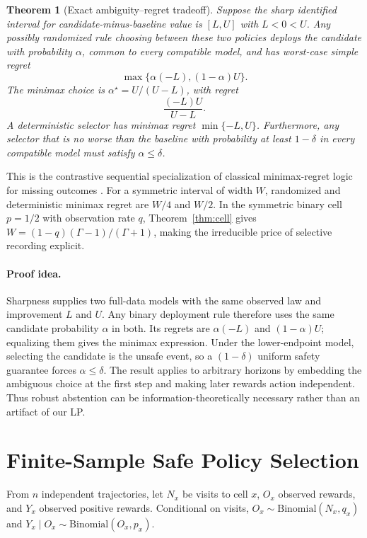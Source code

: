 \documentclass[letterpaper]{article}
\newtheorem{theorem}{Theorem}
\theoremstyle{remark}
\begin{document}
\begin{theorem}[Exact ambiguity--regret tradeoff]\label{thm:minimax}
Suppose the sharp identified interval for candidate-minus-baseline value is $[L,U]$ with $L<0<U$. Any possibly randomized rule choosing between these two policies deploys the candidate with probability $\alpha$, common to every compatible model, and has worst-case simple regret
\begin{equation}
\max\{\alpha(-L),(1-\alpha)U\}. \label{eq:minimax}
\end{equation}
The minimax choice is $\alpha^\star=U/(U-L)$, with regret
\[
\frac{(-L)U}{U-L}.
\]
A deterministic selector has minimax regret $\min\{-L,U\}$. Furthermore, any selector that is no worse than the baseline with probability at least $1-\delta$ in every compatible model must satisfy $\alpha\leq\delta$.
\end{theorem}

This is the contrastive sequential specialization of classical minimax-regret logic for missing outcomes \citep{manski2007missing}. For a symmetric interval of width $W$, randomized and deterministic minimax regret are $W/4$ and $W/2$. In the symmetric binary cell $p=1/2$ with observation rate $q$, Theorem~\ref{thm:cell} gives
$W=(1-q)(\Gamma-1)/(\Gamma+1)$, making the irreducible price of selective recording explicit.

\paragraph{Proof idea.}
Sharpness supplies two full-data models with the same observed law and improvement $L$ and $U$. Any binary deployment rule therefore uses the same candidate probability $\alpha$ in both. Its regrets are $\alpha(-L)$ and $(1-\alpha)U$; equalizing them gives the minimax expression. Under the lower-endpoint model, selecting the candidate is the unsafe event, so a $(1-\delta)$ uniform safety guarantee forces $\alpha\leq\delta$. The result applies to arbitrary horizons by embedding the ambiguous choice at the first step and making later rewards action independent. Thus robust abstention can be information-theoretically necessary rather than an artifact of our LP.

\section{Finite-Sample Safe Policy Selection}
From $n$ independent trajectories, let $N_x$ be visits to cell $x$, $O_x$ observed rewards, and $Y_x$ observed positive rewards. Conditional on visits,
$O_x\sim\mathrm{Binomial}(N_x,q_x)$ and
$Y_x\mid O_x\sim\mathrm{Binomial}(O_x,p_x)$.
\end{document}
